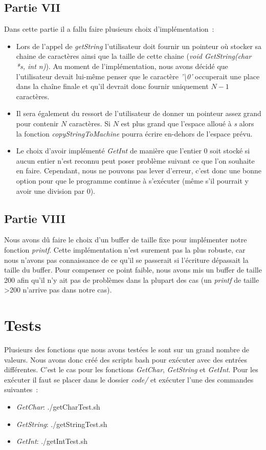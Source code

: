 \documentclass{article}
\begin{document}
\subsection{Partie VII}
Dans cette partie il a fallu faire plusieurs choix d'implémentation :
\begin{itemize}
    \item Lors de l'appel de \textit{getString} l'utilisateur doit fournir un pointeur où
          stocker sa chaine de caractères ainsi que la taille de cette chaine \linebreak
          (\textit{void GetString(char *s, int n)}). Au moment de l'implémentation, nous
          avons décidé que l'utilisateur devait lui-même penser que le caractère
          \textit{'\textbackslash0'} occuperait une place dans la chaîne finale et qu'il
          devrait donc fournir uniquement $N-1$ caractères.
    \item Il sera également du ressort de l'utilisateur de donner un pointeur assez grand
          pour contenir $N$ caractères. Si $N$ est plus grand que l'espace alloué à
          \textit{s} alors la fonction \textit{copyStringToMachine} pourra écrire
          en-dehors de l'espace prévu.
    \item Le choix d'avoir implémenté \textit{GetInt} de manière que l'entier 0 soit stocké
    si aucun entier n'est reconnu peut poser problème suivant ce que l'on souhaite en faire. Cependant,
    nous ne pouvons pas lever d'erreur, c'est donc une bonne option pour que le programme continue à s'exécuter
    (même s'il pourrait y avoir une division par 0).
\end{itemize}

\subsection{Partie VIII} 
Nous avons dû faire le choix d'un buffer de taille fixe pour implémenter notre fonction \textit{printf}. Cette implémentation
n'est surement pas la plus robuste, car nous n'avons pas connaissance de ce qu'il se passerait si l'écriture dépassait la taille 
du buffer. Pour compenser ce point faible, nous avons mis un buffer de taille 200 afin qu'il n'y ait pas de problèmes dans la plupart
des cas (un \textit{printf} de taille \textgreater200 n'arrive pas dans notre cas).
\section{Tests}
Plusieurs des fonctions que nous avons testées le sont sur un grand nombre de valeurs.
Nous avons donc créé des scripts bash pour exécuter avec des entrées différentes.
C'est le cas pour les fonctions \textit{GetChar}, \textit{GetString} et \textit{GetInt}.
Pour les exécuter il faut se placer dans le dossier \textit{code/} et exécuter l'une 
des commandes suivantes :
\begin{itemize}
    \item \textit{GetChar}: ./getCharTest.sh
    \item \textit{GetString}: ./getStringTest.sh
    \item \textit{GetInt}: ./getIntTest.sh
\end{itemize}
\end{document}
